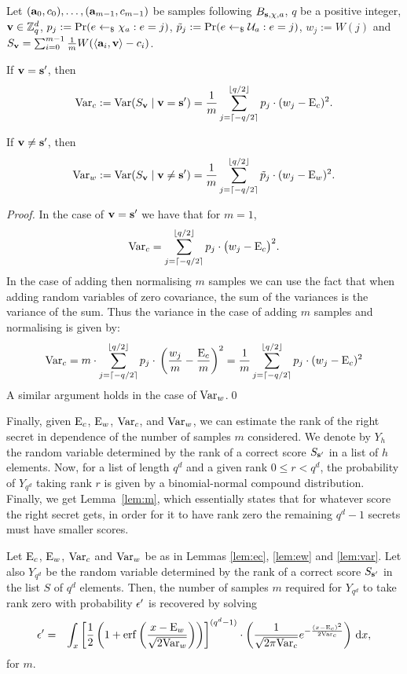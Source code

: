 \def\Varc{\frac{1}{m} \sum_{j=\lowerbound}^{\upperbound} p_j \cdot (w_j - \E_c)^2}
\def\Varw{\frac{1}{m} \sum_{j=\lowerbound}^{\upperbound} \tilde{p}_j \cdot (w_j - \E_w)^2}

\begin{lemma}\label{lem:var}
Let $(\mathbf{a}_0,c_0),\ldots,(\mathbf{a}_{m-1},c_{m-1})$ be samples following $B_{\mathbf{s},\chi,a}$, $q$ be a positive integer, $\mathbf{v} \in \mathbb{Z}_q^d$, $p_j := \Pr(e \leftarrow_{\$} \chi_{a} : e = j)$, $\tilde{p}_j := \Pr(e \leftarrow_{\$} \mathcal{U}_{a} : e = j)$, $w_j := W(j)$ and $S_\vvec = \sum_{i=0}^{m-1}\frac{1}{m} W(\dotp{\avec_i}{\vvec} - c_i)$.

If $\mathbf{v}=\mathbf{s'}$, then \begin{equation}\Var_c:=\Var(S_\vvec \mid \vvec = \solvec)= \Varc.\end{equation}

If $\mathbf{v}\neq\mathbf{s'}$, then \begin{equation}\Var_w:=\Var(S_\vvec \mid \vvec \neq \solvec)= \Varw.\end{equation}
\end{lemma}

\begin{proof}
In the case of $\mathbf{v}=\mathbf{s'}$ we have that for $m=1$, $$\textnormal{Var}_c = \sum_{j=\lceil -q/2 \rceil}^{\lfloor q/2\rfloor}{p_{j}\cdot{}\big(w_j-\textnormal{E}_c\big)^2}.$$ In the case of adding then normalising $m$ samples we can use the fact that when adding random variables of zero covariance, the sum of the variances is the variance of the sum. 
Thus the variance in the case of adding $m$ samples and normalising is given by:
$$\Var_c = m\cdot\sum_{j=\lowerbound}^{\upperbound}{p_{j}\cdot{}\left(\frac{w_{j}}{m}-\frac{\E_c}{m}\right)^2}=\Varc$$
A similar argument holds in the case of $\textnormal{Var}_w$.\qed
\end{proof}

Finally, given $\textnormal{E}_c$, $\textnormal{E}_w$, $\textnormal{Var}_c$, and $\textnormal{Var}_w$, we can estimate the rank of the right secret in dependence of the number of samples $m$ considered. We denote by $Y_h$ the random variable determined by the rank of a correct score $S_\mathbf{s'}$ in a list of $h$ elements. Now, for a list of length $q^d$ and a given rank $0 \leq r < q^d$, the probability of $Y_{q^d}$ taking rank $r$ is given by a binomial-normal compound distribution. Finally, we get Lemma~\ref{lem:m}, which essentially states that for whatever score the right secret gets, in order for it to have rank zero the remaining $q^d-1$ secrets must have smaller scores.

\begin{lemma}\label{lem:m}
Let $\textnormal{E}_c$, $\textnormal{E}_w$, $\textnormal{Var}_c$ and $\textnormal{Var}_w$ be as in Lemmas \ref{lem:ec}, \ref{lem:ew} and \ref{lem:var}. Let also $Y_{q^d}$ be the random variable determined by the rank of a correct score $S_\mathbf{s'}$ in the list $S$ of $q^d$ elements. Then, the number of samples $m$ required for $Y_{q^d}$ to take rank zero with probability $\epsilon'$ is recovered by solving
\begin{eqnarray*}
\epsilon'&=&\int_{x}{\left[\frac{1}{2}\left(1+\operatorname{erf}\left(\frac{x-\textnormal{E}_w}{\sqrt{2\textnormal{Var}_w}}\right)\right)\right]^{(q^d-1)} \cdot \left( \frac{1}{\sqrt{2\pi \textnormal{Var}_c}}e^{-\frac{(x-\textnormal{E}_c)^2}{2\textnormal{Var}_c}} \right)}\ \mathrm{d}x,
\end{eqnarray*}
for $m$.
\end{lemma}

